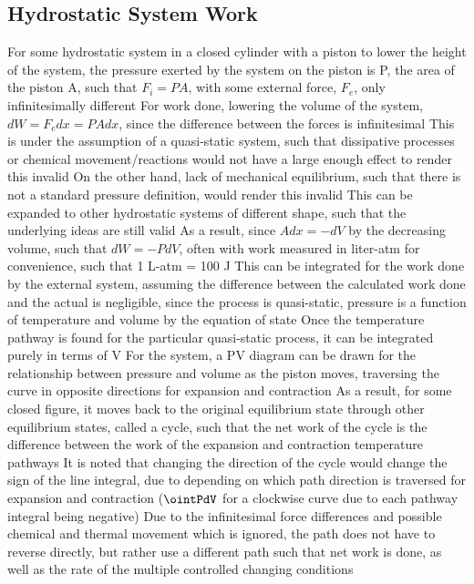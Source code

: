 \documentclass[11 pt, twoside]{article}
\newenvironment{outline*}
{
	\begin{outline}[enumerate]
	}
	{\end{outline}
}
\begin{document}
\subsection{Hydrostatic System Work}
\begin{outline*}
\1 For some hydrostatic system in a closed cylinder with a piston to lower the height of the system, the pressure exerted by the system on the piston is P, the area of the piston A, such that $F_i = PA$, with some external force, $F_e$, only infinitesimally different
\2 For work done, lowering the volume of the system, $dW = F_edx = PAdx$, since the difference between the forces is infinitesimal
\3 This is under the assumption of a quasi-static system, such that dissipative processes or chemical movement/reactions would not have a large enough effect to render this invalid
\3 On the other hand, lack of mechanical equilibrium, such that there is not a standard pressure definition, would render this invalid
\3 This can be expanded to other hydrostatic systems of different shape, such that the underlying ideas are still valid
\2 As a result, since $Adx = -dV$ by the decreasing volume, such that $dW = -PdV$, often with work measured in liter-atm for convenience, such that 1 L-atm = 100 J
\3 This can be integrated for the work done by the external system, assuming the difference between the calculated work done and the actual is negligible, since the process is quasi-static, pressure is a function of temperature and volume by the equation of state
\3 Once the temperature pathway is found for the particular quasi-static process, it can be integrated purely in terms of V
\1 For the system, a PV diagram can be drawn for the relationship between pressure and volume as the piston moves, traversing the curve in opposite directions for expansion and contraction
\2 As a result, for some closed figure, it moves back to the original equilibrium state through other equilibrium states, called a cycle, such that the net work of the cycle is the difference between the work of the expansion and contraction temperature pathways
\2 It is noted that changing the direction of the cycle would change the sign of the line integral, due to depending on which path direction is traversed for expansion and contraction ($\ointPdV$ for a clockwise curve due to each pathway integral being negative)
\2 Due to the infinitesimal force differences and possible chemical and thermal movement which is ignored, the path does not have to reverse directly, but rather use a different path such that net work is done, as well as the rate of the multiple controlled changing conditions

\end{outline*}
\end{document}
